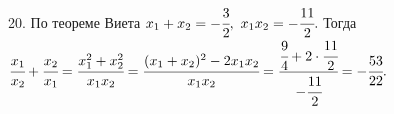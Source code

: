 20. По теореме Виета $x_1+x_2=-\cfrac{3}{2},\ x_1x_2=-\cfrac{11}{2}.$ Тогда $\cfrac{x_1}{x_2}+\cfrac{x_2}{x_1}=\cfrac{x_1^2+x_2^2}{x_1x_2}=
\cfrac{(x_1+x_2)^2-2x_1x_2}{x_1x_2}=\cfrac{\cfrac{9}{4}+2\cdot\cfrac{11}{2}}{-\cfrac{11}{2}}=-\cfrac{53}{22}.$\\
